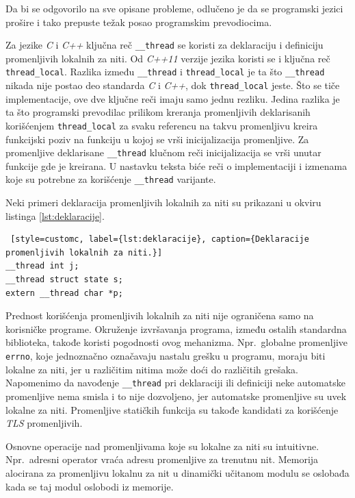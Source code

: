 \documentclass[12pt,oneside]{memoir}
\begin{document}
Da bi se odgovorilo na sve opisane probleme, odlučeno je da se programski jezici prošire i tako prepuste težak posao programskim prevodiocima.

Za jezike \emph{C} i \emph{C++} ključna reč \texttt{\_\_thread} se koristi za deklaraciju i definiciju promenljivih lokalnih za niti. Od \emph{C++11} verzije jezika koristi se i ključna reč \texttt{thread\_local}. Razlika između \texttt{\_\_thread} i \texttt{thread\_local} je ta što \texttt{\_\_thread} nikada nije postao deo standarda \emph{C} i \emph{C++}, dok \texttt{thread\_local} jeste. Što se tiče implementacije, ove dve ključne reči imaju samo jednu rezliku. Jedina razlika je ta što programski prevodilac prilikom kreranja promenljivih deklarisanih korišćenjem \texttt{thread\_local} za svaku referencu na takvu promenljivu kreira funkcijski poziv na funkciju u kojoj se vrši inicijalizacija promenljive. Za promenljive deklarisane \texttt{\_\_thread} klučnom reči inicijalizacija se vrši unutar funkcije gde je kreirana. U nastavku teksta biće reči o implementaciji i izmenama koje su potrebne za korišćenje \texttt{\_\_thread} varijante.

Neki primeri deklaracija promenljivih lokalnih za niti su prikazani u okviru listinga \ref{lst:deklaracije}.

\begin{lstlisting} [style=customc, label={lst:deklaracije}, caption={Deklaracije promenljivih lokalnih za niti.}]
__thread int j;
__thread struct state s;
extern __thread char *p;
\end{lstlisting}

Prednost korišćenja promenljivih lokalnih za niti nije ograničena samo na korisničke programe. Okruženje izvršavanja programa, između ostalih standardna biblioteka, takođe koristi pogodnosti ovog mehanizma. Npr.~globalne promenljive \texttt{errno}, koje jednoznačno označavaju nastalu grešku u programu, moraju biti lokalne za niti, jer u različitim nitima može doći do različitih grešaka. Napomenimo da navođenje \texttt{\_\_thread} pri deklaraciji ili definiciji neke automatske promenljive nema smisla i to nije dozvoljeno, jer automatske promenljive su uvek lokalne za niti. Promenljive statičkih funkcija su takođe kandidati za korišćenje \emph{TLS} promenljivih.

Osnovne operacije nad promenljivama koje su lokalne za niti su intuitivne. Npr.~adresni operator vraća adresu promenljive za trenutnu nit. Memorija alocirana za promenljivu lokalnu za nit u dinamički učitanom modulu se oslobađa kada se taj modul oslobodi iz memorije.
\end{document}
